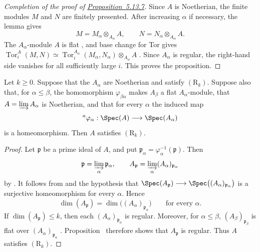 \begin{proof}[Completion of the proof of {\hyperref[IV.5.13.7]{Proposition~5.13.7}}]
Since $A$ is Noetherian, the finite modules $M$ and $N$ are
finitely presented.  After increasing $\alpha$ if necessary, the
lemma gives
\[
  M=M_\alpha\otimes_{A_\alpha}A,
  \qquad
  N=N_\alpha\otimes_{A_\alpha}A.
\]
The $A_\alpha$-module $A$ is flat , and base
change for Tor gives $\operatorname{Tor}^{A}_i(M,N)
\simeq
\operatorname{Tor}^{A_\alpha}_i(M_\alpha,N_\alpha)
\otimes_{A_\alpha}A$
.  Since $A_\alpha$ is regular, the
right-hand side vanishes for all sufficiently large $i$.  This
proves the proposition.
\end{proof}

\begin{corollary}[5.13.8]
\label{IV.5.13.8}
Let $k\geq0$.  Suppose that the $A_\alpha$ are Noetherian and
satisfy $(\mathrm R_k)$.  Suppose also that, for
$\alpha\leq\beta$, the homomorphism $\varphi_{\beta\alpha}$
makes $A_\beta$ a flat $A_\alpha$-module, that
$A=\varinjlim A_\alpha$ is Noetherian, and that for every
$\alpha$ the induced map
\[
  {}^{a}\varphi_\alpha:
  \Spec(A)\longrightarrow\Spec(A_\alpha)
\]
is a homeomorphism.  Then $A$ satisfies $(\mathrm R_k)$.
\end{corollary}

\begin{proof}
Let $\mathfrak p$ be a prime ideal of $A$, and put $\mathfrak p_\alpha
=\varphi_\alpha^{-1}(\mathfrak p)$.
Then
\[
  \mathfrak p=\varinjlim_\alpha\mathfrak p_\alpha,
  \qquad
  A_{\mathfrak p}
  =\varinjlim_\alpha(A_\alpha)_{\mathfrak p_\alpha}
\]
by .  It follows from
 and the hypothesis that $\Spec(A_{\mathfrak p})
\longrightarrow
\Spec\bigl((A_\alpha)_{\mathfrak p_\alpha}\bigr)$
is a surjective homeomorphism for every $\alpha$.  Hence
\[
  \dim(A_{\mathfrak p})
  =
  \dim\bigl((A_\alpha)_{\mathfrak p_\alpha}\bigr)
  \qquad\text{for every }\alpha.
\]
If $\dim(A_{\mathfrak p})\leq k$, then each
$(A_\alpha)_{\mathfrak p_\alpha}$ is regular.  Moreover, for
$\alpha\leq\beta$,
$(A_\beta)_{\mathfrak p_\beta}$ is flat over
$(A_\alpha)_{\mathfrak p_\alpha}$ .
Proposition~ therefore shows that
$A_{\mathfrak p}$ is regular.  Thus $A$ satisfies
$(\mathrm R_k)$.
\end{proof}
